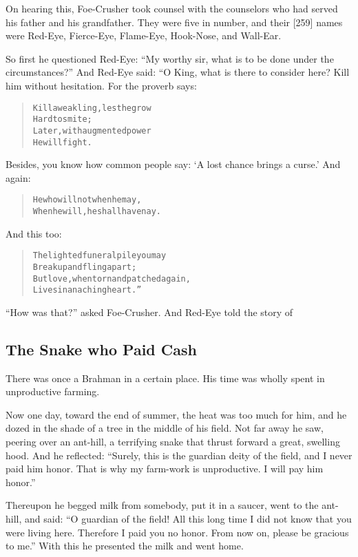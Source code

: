 \documentclass[article, twoside, 14pt]{memoir}
\renewenvironment{verbatim}{%
\begin{quote}%
\vskip -10pt%
\begin{alltt}\normalfont\large}{\end{alltt}%
\end{quote}%
\vskip -10pt
} %
\begin{document}
On hearing this, Foe-Crusher took counsel with the counselors who
had served his father and his grandfather. They were five in
number, and their [259] names were Red-Eye, Fierce-Eye, Flame-Eye,
Hook-Nose, and Wall-Ear.

So first he questioned Red-Eye:
``My worthy sir, what is to be done under the circumstances?'' And
Red-Eye said: “O King, what is there to consider here? Kill him
without hesitation. For the proverb says:

\begin{verbatim}
Kill a weakling, lest he grow
    Hard to smite;
Later, with augmented power
    He will fight.
\end{verbatim}
Besides, you know how common people say:
`A lost chance brings a curse.' And again:

\begin{verbatim}
He who will not when he may,
When he will, he shall have nay.
\end{verbatim}
And this too:

\begin{verbatim}
The lighted funeral pile you may
    Break up and fling apart;
But love, when torn and patched again,
    Lives in an aching heart.”
\end{verbatim}
``How was that?'' asked Foe-Crusher. And Red-Eye told the story of

\subsection{The Snake who Paid Cash}

\label{s53}

There was once a Brahman in a certain place. His time was wholly
spent in unproductive farming.

Now one day, toward the end of summer, the heat was too much for
him, and he dozed in the shade of a tree in the middle of his
field. Not far away he saw, peering over an ant-hill, a terrifying
snake that thrust forward a great, swelling hood. And he reflected:
``Surely, this is the guardian deity of the field, and I never paid him honor. That is why my farm-work is unproductive. I will pay him honor.''

Thereupon he begged milk from somebody, put it in a saucer, went to
the ant-hill, and said:
``O guardian of the field! All this long time I did not know that you were living here. Therefore I paid you no honor. From now on, please be gracious to me.''
With this he presented the milk and went home.
\end{document}
